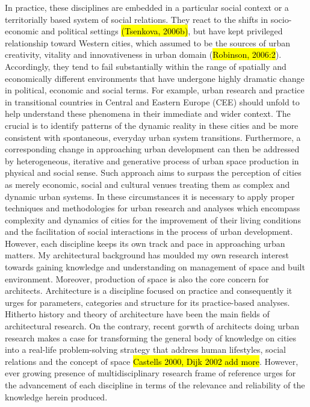 \documentclass[11pt]{report}
\begin{document}
In practice, these disciplines are embedded in a particular social context or a territorially based system of social relations. They react to the shifts in socio-economic and political settings \hl{(Tsenkova, 2006b)}, but have kept privileged relationship toward Western cities, which assumed to be the sources of urban creativity, vitality and innovativeness in urban domain (\hl{Robinson, 2006:2}). Accordingly, they tend to fail substantially within the range of spatially and economically different environments that have undergone highly dramatic change in political, economic and social terms. For example, urban research and practice in transitional countries in Central and Eastern Europe (CEE) should unfold to help understand these phenomena in their immediate and wider context. The crucial is to identify patterns of the dynamic reality in these cities and be more consistent with spontaneous, everyday urban system transitions. Furthermore, a corresponding change in approaching urban development can then be addressed by heterogeneous, iterative and generative process of urban space production in physical and social sense. Such approach aims to surpass the perception of cities as merely economic, social and cultural venues treating them as complex and dynamic urban systems. In these circumstances it is necessary to apply proper techniques and methodologies for urban research and analyses which encompass complexity and dynamics of cities for the improvement of their living conditions and the facilitation of social interactions in the process of urban development.
\\
However, each discipline keeps its own track and pace in approaching urban matters. My architectural background has moulded my own research interest towards gaining knowledge and understanding on management of space and built environment. Moreover, production of space is also the core concern for architects. Architecture is a discipline focused on practice and consequently it urges for parameters, categories and structure for its practice-based analyses. Hitherto history and theory of architecture have been the main fields of architectural research. On the contrary, recent gorwth of architects doing urban research makes a case for transforming the general body of knowledge on cities into a real-life problem-solving strategy that address human lifestyles, social relations and the concept of space \hl{Castells 2000, Dijk 2002 add more}. However, ever growing presence of multidisciplinary research frame of reference urges for the advancement of each discipline in terms of the relevance and reliability of the knowledge herein produced.
\end{document}
